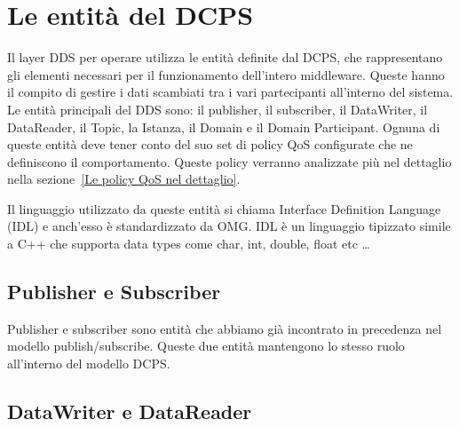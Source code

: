 

\section{Le entità del DCPS}
Il layer DDS per operare utilizza le entità definite dal DCPS, 
che rappresentano gli elementi necessari
per il funzionamento dell'intero middleware. Queste hanno il compito di 
gestire i dati
scambiati tra i vari partecipanti all'interno del sistema. 
Le entità principali del DDS sono: 
il publisher, il subscriber, il DataWriter, il DataReader, il Topic,
la Istanza, il Domain e il Domain Participant.
Ognuna di queste entità deve tener conto del suo set di policy 
QoS configurate
che ne definiscono il comportamento. Queste policy verranno analizzate 
più nel dettaglio nella sezione~\ref{Le policy QoS nel dettaglio}.

Il linguaggio utilizzato da queste entità si chiama Interface 
Definition Language (IDL) e anch'esso è standardizzato da OMG. 
IDL è un linguaggio tipizzato 
simile a C++ che supporta data types come char, int, double, float etc
\cite{1494965} \dots


\subsection{Publisher e Subscriber}
Publisher e subscriber sono entità che abbiamo già incontrato
in precedenza nel modello publish/subscribe. Queste due entità 
mantengono lo stesso ruolo all'interno del modello DCPS.

\subsection{DataWriter e DataReader}

